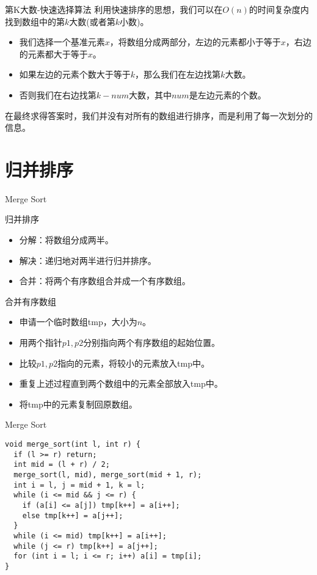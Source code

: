 \documentclass{ldr-simple-gray}
\begin{document}
  \begin{frame}{第K大数-快速选择算法}
    利用快速排序的思想，我们可以在$O(n)$的时间复杂度内找到数组中的第$k$大数(或者第$k$小数)。
    \begin{itemize}
      \item 我们选择一个基准元素$x$，将数组分成两部分，左边的元素都小于等于$x$，右边的元素都大于等于$x$。
      \item 如果左边的元素个数大于等于$k$，那么我们在左边找第$k$大数。
      \item 否则我们在右边找第$k-num$大数，其中$num$是左边元素的个数。
    \end{itemize}
    在最终求得答案时，我们并没有对所有的数组进行排序，而是利用了每一次划分的信息。
  \end{frame}

  \section{归并排序}
  \begin{frame}{Merge Sort}
    \begin{block}{归并排序}
      \begin{itemize}
        \item 分解：将数组分成两半。
        \item 解决：递归地对两半进行归并排序。
        \item 合并：将两个有序数组合并成一个有序数组。
      \end{itemize}
    \end{block}

    \begin{block}{合并有序数组}
      \begin{itemize}
        \item 申请一个临时数组tmp，大小为$n$。
        \item 用两个指针$p1,p2$分别指向两个有序数组的起始位置。
        \item 比较$p1,p2$指向的元素，将较小的元素放入tmp中。
        \item 重复上述过程直到两个数组中的元素全部放入tmp中。
        \item 将tmp中的元素复制回原数组。
      \end{itemize}
    \end{block}
  \end{frame}

  \begin{frame}[fragile]{Merge Sort}
    \begin{verbatim}
void merge_sort(int l, int r) {
  if (l >= r) return;
  int mid = (l + r) / 2;
  merge_sort(l, mid), merge_sort(mid + 1, r);
  int i = l, j = mid + 1, k = l;
  while (i <= mid && j <= r) {
    if (a[i] <= a[j]) tmp[k++] = a[i++];
    else tmp[k++] = a[j++];
  }
  while (i <= mid) tmp[k++] = a[i++];
  while (j <= r) tmp[k++] = a[j++];
  for (int i = l; i <= r; i++) a[i] = tmp[i];
}
    \end{verbatim}
  \end{frame}
\end{document}
